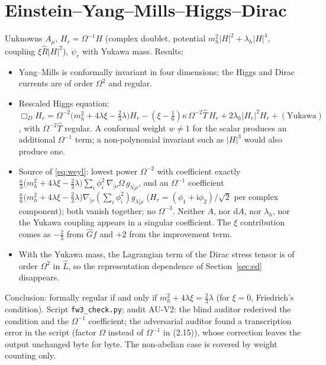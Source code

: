 \documentclass[11pt,a4paper]{article}
\newcommand{\dd}{\mathrm{d}}
\newcommand{\ii}{\mathrm{i}}
\begin{document}
\section{Einstein--Yang--Mills--Higgs--Dirac}
\label{sec:fw3}
Unknowns $A_{\mu}$, $H_{r}=\Omega^{-1}H$ (complex doublet, potential $m_{h}^{2}|H|^{2}+\lambda_{h}|H|^{4}$, coupling $\xi\hat R|H|^{2}$), $\psi_{r}$ with Yukawa mass. Results:
\begin{itemize}[leftmargin=1.5em]
\item Yang--Mills is conformally invariant in four dimensions; the Higgs and Dirac currents are of order $\Omega^{2}$ and regular.
\item Rescaled Higgs equation: $\Box_{D}H_{r}=\Omega^{-2}\big(m_{h}^{2}+4\lambda\xi-\tfrac23\lambda\big)H_{r}-(\xi-\tfrac16)\kappa\,\Omega^{-2}\hat T\,H_{r}+2\lambda_{h}|H_{r}|^{2}H_{r}+(\text{Yukawa})$, with $\Omega^{-2}\hat T$ regular. A conformal weight $w\neq1$ for the scalar produces an additional $\Omega^{-1}$ term; a non-polynomial invariant such as $|H|^{3}$ would also produce one.
\item Source of \eqref{eq:weyl}: lowest power $\Omega^{-2}$ with coefficient exactly $\tfrac{\kappa}{3}\big(m_{h}^{2}+4\lambda\xi-\tfrac23\lambda\big)\sum_{i}\phi_{i}^{2}\,\nabla_{[\nu}\Omega\,g_{\lambda]\rho}$, and an $\Omega^{-1}$ coefficient $\tfrac{\kappa}{6}\big(m_{h}^{2}+4\lambda\xi-\tfrac23\lambda\big)\nabla_{[\nu}(\sum_{i}\phi_{i}^{2})g_{\lambda]\rho}$ ($H_{r}=(\phi_{1}+\ii\phi_{2})/\sqrt2$ per complex component); both vanish together; no $\Omega^{-3}$. Neither $A$, nor $\dd A$, nor $\lambda_{h}$, nor the Yukawa coupling appears in a singular coefficient. The $\xi$ contribution comes as $-\tfrac23$ from $\hat G f$ and $+2$ from the improvement term.
\item With the Yukawa mass, the Lagrangian term of the Dirac stress tensor is of order $\Omega^{2}$ in $\hat L$, so the representation dependence of Section~\ref{sec:ed} disappears.
\end{itemize}
Conclusion: formally regular if and only if $m_{h}^{2}+4\lambda\xi=\tfrac23\lambda$ (for $\xi=0$, Friedrich's condition). Script \texttt{fw3\_check.py}; audit AU-V2: the blind auditor rederived the condition and the $\Omega^{-1}$ coefficient; the adversarial auditor found a transcription error in the script (factor $\Omega$ instead of $\Omega^{-1}$ in (2.15)), whose correction leaves the output unchanged byte for byte. The non-abelian case is covered by weight counting only.
\end{document}
